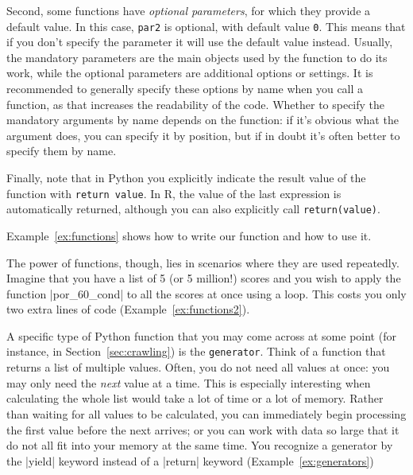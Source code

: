 Second, some functions have \emph{optional parameters}, for which they provide a default value.
In this case, \verb|par2| is optional, with default value \verb|0|.
This means that if you don't specify the parameter it will use the default value instead.
Usually, the mandatory parameters are the main objects used by the function to do its work,
while the optional parameters are additional options or settings.
It is recommended to generally specify these options by name when you call a function,
as that increases the readability of the code.
Whether to specify the mandatory arguments by name depends on the function:
if it's obvious what the argument does, you can specify it by position,
but if in doubt it's often better to specify them by name. 

Finally, note that in Python you explicitly indicate the result value of the function with
\verb|return value|.
In R, the value of the last expression is automatically returned,
although you can also explicitly call \verb|return(value)|. 

Example~\ref{ex:functions} shows how to write our function and how to use it.

The power of functions, though, lies in scenarios where they are used
repeatedly.  Imagine that you have a list of 5 (or 5 million!) scores
and you wish to apply the function |por_60_cond| to all the scores at
once using a loop. This costs you only two extra lines of code
(Example~\ref{ex:functions2}).



\begin{feature}
  A specific type of Python function that you may come across at some point (for instance, in Section~\ref{sec:crawling}) is the \texttt{generator}. 
  Think of a function that returns a list of multiple values. Often, you do not need all values at once: you may only 
  need the \emph{next} value at a time. This is especially interesting when calculating the whole list would take a lot of time or a lot 
  of memory. Rather than waiting for all values to be calculated, you can immediately begin processing the first value before the next arrives; or 
  you can work with data so large that it do not all fit into your memory at the same time.  You recognize a generator by 
  the |yield| keyword instead of a |return| keyword (Example~\ref{ex:generators})
\end{feature}

